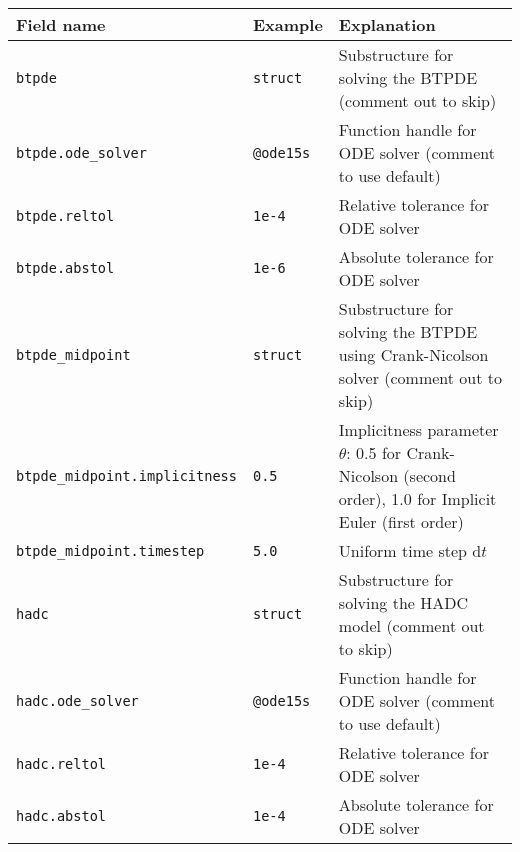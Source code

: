 \begin{tabular}{|l|l|p{6cm}|} \hline

    Field name              & Example                 & Explanation                                                                                                  \\ \hline

    \verb+btpde+  & \verb+struct+  & Substructure for solving the BTPDE (comment out to skip)                                                     \\ \hline
    \verb+btpde.ode_solver+  & \verb+@ode15s+  & Function handle for ODE solver (comment to use default)                                                      \\ \hline
    \verb+btpde.reltol+  & \verb+1e-4+  & Relative tolerance for ODE solver                                                                            \\ \hline
    \verb+btpde.abstol+  & \verb+1e-6+  & Absolute tolerance for ODE solver                                                                            \\ \hline

    \verb+btpde_midpoint+  & \verb+struct+ & Substructure for solving the BTPDE using Crank-Nicolson solver (comment out to skip)                         \\ \hline
    \verb+btpde_midpoint.implicitness+ & \verb+0.5+ & Implicitness parameter $\theta$: 0.5 for Crank-Nicolson (second order), 1.0 for Implicit Euler (first order) \\ \hline
    \verb+btpde_midpoint.timestep+ & \verb+5.0+ & Uniform time step $\mathrm{d} t$                                                                             \\ \hline

    \verb+hadc+ & \verb+struct+ & Substructure for solving the HADC model (comment out to skip)                                                \\ \hline
    \verb+hadc.ode_solver+ & \verb+@ode15s+ & Function handle for ODE solver (comment to use default)                                                      \\ \hline
    \verb+hadc.reltol+ & \verb+1e-4+ & Relative tolerance for ODE solver                                                                            \\ \hline
    \verb+hadc.abstol+ & \verb+1e-4+ & Absolute tolerance for ODE solver                                                                            \\ \hline


\end{tabular}
